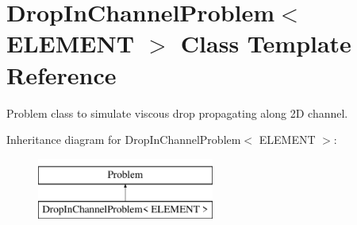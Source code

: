 \hypertarget{classDropInChannelProblem}{}\section{Drop\+In\+Channel\+Problem$<$ E\+L\+E\+M\+E\+NT $>$ Class Template Reference}
\label{classDropInChannelProblem}


Problem class to simulate viscous drop propagating along 2D channel.  


Inheritance diagram for Drop\+In\+Channel\+Problem$<$ E\+L\+E\+M\+E\+NT $>$\+:\begin{figure}[H]
\begin{center}
\leavevmode
\includegraphics[height=2.000000cm]{classDropInChannelProblem}
\end{center}
\end{figure}

